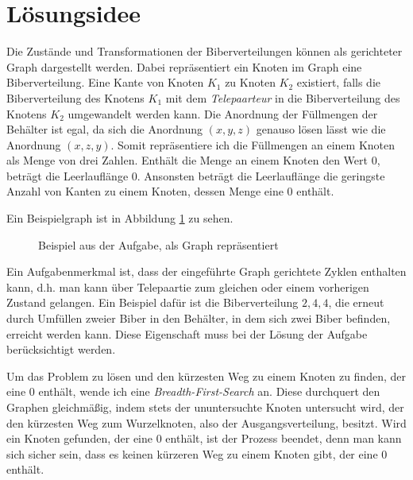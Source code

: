 \documentclass[a4paper,10pt,ngerman]{scrartcl}
\title{\Aufgabe}
\author{\Name\\Team-ID: \Einsendenummer}
\date{\today}
\begin{document}
\maketitle
\tableofcontents

\section{Lösungsidee}
Die Zustände und Transformationen der Biberverteilungen können als gerichteter Graph dargestellt werden.
Dabei repräsentiert ein Knoten im Graph eine Biberverteilung.
Eine Kante von Knoten $K_1$ zu Knoten $K_2$ existiert, falls die Biberverteilung des Knotens $K_1$ mit dem \textit{Telepaarteur} in die Biberverteilung des Knotens $K_2$ umgewandelt werden kann.
Die Anordnung der Füllmengen der Behälter ist egal, da sich die Anordnung $(x,y,z)$ genauso lösen lässt wie die Anordnung $(x,z,y)$.
Somit repräsentiere ich die Füllmengen an einem Knoten als Menge von drei Zahlen.
Enthält die Menge an einem Knoten den Wert 0, beträgt die Leerlauflänge 0.
Ansonsten beträgt die Leerlauflänge die geringste Anzahl von Kanten zu einem Knoten, dessen Menge eine 0 enthält.

Ein Beispielgraph ist in Abbildung \ref{fig:graph-idee} zu sehen.

\begin{figure}
\centering
{}
\label{fig:graph-idee}
\caption{Beispiel aus der Aufgabe, als Graph repräsentiert}
\end{figure}

Ein Aufgabenmerkmal ist, dass der eingeführte Graph gerichtete Zyklen enthalten kann, d.h. man kann über Telepaartie zum gleichen oder einem vorherigen Zustand gelangen.
Ein Beispiel dafür ist die Biberverteilung ${2,4,4}$, die erneut durch Umfüllen zweier Biber in den Behälter, in dem sich zwei Biber befinden, erreicht werden kann.
Diese Eigenschaft muss bei der Lösung der Aufgabe berücksichtigt werden.

Um das Problem zu lösen und den kürzesten Weg zu einem Knoten zu finden, der eine $0$ enthält, wende ich eine \textit{Breadth-First-Search} an.
Diese durchquert den Graphen gleichmäßig, indem stets der ununtersuchte Knoten untersucht wird, der den kürzesten Weg zum Wurzelknoten, also der Ausgangsverteilung, besitzt.
Wird ein Knoten gefunden, der eine $0$ enthält, ist der Prozess beendet, denn man kann sich sicher sein, dass es keinen kürzeren Weg zu einem Knoten gibt, der eine $0$ enthält.
\end{document}
